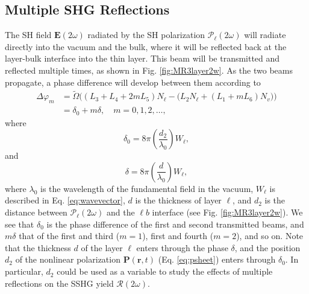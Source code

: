 
\subsection{Multiple SHG Reflections}

The SH field $\mathbf{E}(2\omega)$ radiated by the SH polarization
$\boldsymbol{\mathcal{P}}_{\ell}(2\omega)$ will radiate directly into the vacuum
and the bulk, where it will be reflected back at the layer-bulk interface into
the thin layer. This beam will be transmitted and reflected multiple times, as
shown in Fig. \ref{fig:MR3layer2w}. As the two beams propagate, a phase
difference will develop between them according to
\begin{equation}\label{eq:m99}
\begin{split}
\Delta\varphi_{m} 
&= \tilde{\Omega}
\Big(
(L_{3} + L_{4} + 2mL_{5})N_{\ell}
 - \big(L_{2}N_{\ell} + (L_{1} + mL_{6})N_{v}\big)
\Big)\\
&= \delta_{0} + m\delta,\quad m=0,1,2,\ldots,
\end{split}
\end{equation}
where
\begin{equation}\label{eq:delta0}
\delta_{0} =
8\pi\left(\frac{d_{2}}{\lambda_{0}}\right)W_{\ell},
\end{equation}
and
\begin{equation}\label{eq:delta}
\delta = 8\pi
\left(\frac{d}{\lambda_{0}}\right)W_{\ell},
\end{equation}
where $\lambda_{0}$ is the wavelength of the fundamental field in the vacuum,
$W_{\ell}$ is described in Eq. \eqref{eq:wavevector}, $d$ is the
thickness of layer $\ell$, and $d_{2}$ is the distance between
$\boldsymbol{\mathcal{P}}_{\ell}(2\omega)$ and the $\ell b$ interface (see Fig.
\ref{fig:MR3layer2w}). We see that $\delta_{0}$ is the phase difference of the
first and second transmitted beams, and $m\delta$ that of the first and third
($m = 1$), first and fourth ($m = 2$), and so on. Note that the thickness $d$ of
the layer $\ell$ enters through the phase $\delta$, and the position $d_{2}$ of
the nonlinear polarization $\mathbf{P}(\mathbf{r},t)$ (Eq. \eqref{eq:psheet})
enters through $\delta_{0}$. In particular, $d_{2}$ could be used as a variable
to study the effects of multiple reflections on the SSHG yield
$\mathcal{R}(2\omega)$.

